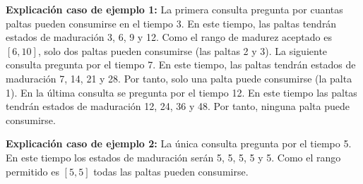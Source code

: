 \documentclass{oci}
\begin{document}
\begin{sampleDescription}
\begin{center}
\begin{minipage}{0.95\textwidth}
\textbf{Explicación caso de ejemplo 1:} La primera consulta pregunta por cuantas paltas pueden consumirse en el tiempo 3.
En este tiempo, las paltas tendrán estados de maduración 3, 6, 9 y 12.
Como el rango de madurez aceptado es $[6, 10]$, solo dos paltas pueden consumirse (las paltas 2 y 3).
La siguiente consulta pregunta por el tiempo 7.
En este tiempo, las paltas tendrán estados de maduración 7, 14, 21 y 28.
Por tanto, solo una palta puede consumirse (la palta 1).
En la última consulta se pregunta por el tiempo 12.
En este tiempo las paltas tendrán estados de maduración 12, 24, 36 y 48.
Por tanto, ninguna palta puede consumirse.
\end{minipage}
\end{center}

\newpage
{}
\begin{center}
\begin{minipage}{0.95\textwidth}
\textbf{Explicación caso de ejemplo 2:}
La única consulta pregunta por el tiempo 5.
En este tiempo los estados de maduración serán 5, 5, 5, 5 y 5.
Como el rango permitido es $[5, 5]$ todas las paltas pueden consumirse.
\end{minipage}
\end{center}
\end{sampleDescription}
\end{document}
